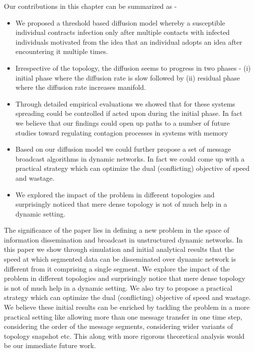 \noindent
Our contributions in this chapter can be summarized as - 
\begin{itemize}
 \item We proposed a threshold based diffusion model whereby a susceptible individual contracts infection only after multiple contacts with infected individuals motivated 
 from the idea that an individual adopts an idea after encountering it multiple times.
 \item Irrespective of the topology, the diffusion seems to progress in two phases - (i) initial phase where the diffusion rate is slow followed by (ii) residual phase where 
 the diffusion rate increases manifold.
 \item Through detailed empirical evaluations we showed that for these systems spreading could be controlled if acted upon during the initial phase. In fact  
 we believe that our findings could open up paths to a number of future studies toward regulating contagion processes in systems with memory
 \item Based on our diffusion model we could further propose a set of message broadcast algorithms in dynamic networks. In fact we could come up with a practical strategy which 
can optimize the dual (conflicting) objective of speed and wastage. 
 \item We explored the impact of the problem in different topologies and surprisingly noticed that mere dense 
topology is not of much help in a dynamic setting.
\end{itemize}


The significance of the paper lies in  defining a new problem in the space of information dissemination and broadcast in unstructured dynamic networks. 
In this paper we show through simulation and initial analytical results that
 the speed at which segmented data can be disseminated 
over dynamic network is different from it comprising a single segment. 
We explore the impact of the problem in different topologies and surprisingly notice that mere dense 
topology is not of much help in a dynamic setting. We also try to propose a practical strategy which 
can optimize the dual (conflicting) objective of speed and wastage. 
We believe these initial results can be enriched by  tackling the problem in a more practical setting 
like allowing more than one message transfer in one time step, considering the order of the 
message segments, considering wider variants of topology snapshot etc. 
This along with more rigorous theoretical analysis would be our immediate future work. 

